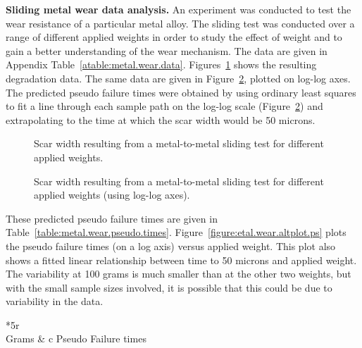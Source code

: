 \begin{example}
{\bf Sliding metal wear data analysis.}  
\label{example:sliding.wear.simple}
An experiment was conducted to test the wear resistance of a
particular metal alloy. The sliding test was conducted over a range
of different applied weights in order to study the effect of weight
and to gain a better understanding of the wear mechanism.  The data
are given in Appendix Table~\ref{atable:metal.wear.data}.
Figures~\ref{figure:metal.wear.ps} shows the resulting degradation
data.  The same data are given in
Figure~\ref{figure:log.metal.wear.ps}, plotted on log-log axes. The
predicted pseudo failure times were obtained by using ordinary least
squares to fit a line through each sample path on the log-log scale
(Figure~\ref{figure:log.metal.wear.ps}) and extrapolating to the
time at which the scar width would be 50 microns.
\begin{figure}
\caption{Scar width resulting from a
metal-to-metal sliding test for different applied weights.}
\label{figure:metal.wear.ps}
\end{figure}
\begin{figure}
\caption{Scar width resulting from a
metal-to-metal sliding test for different applied weights (using
log-log axes).}
\label{figure:log.metal.wear.ps}
\end{figure}
These predicted pseudo failure times are given in
Table~\ref{table:metal.wear.pseudo.times}.
Figure~\ref{figure:etal.wear.altplot.ps} plots the pseudo failure
times (on a log axis) versus applied weight. This plot also
shows a fitted
linear relationship between time to 50 microns and applied
weight. The variability at 100 grams is much smaller than at the
other two weights, but with the small sample sizes involved, it is
possible that this could be due to variability in the data.
\begin{table}
\caption{Metal-wear ``failure'' times in hours.}
\centering\small
\begin{tabular}{*{5}{r}}
\\[-.5ex]
\hline
Grams &  {c} {Pseudo Failure times}\\

\end{tabular}
\end{table}
\end{example}

